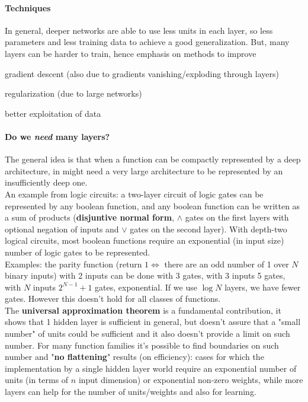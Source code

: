 \documentclass[10pt]{report}
\begin{document}
\paragraph{Techniques} In general, deeper networks are able to use less units in each layer, so less parameters and less training data to achieve a good generalization. But, many layers can be harder to train, hence emphasis on methods to improve
\begin{list}{}{}
	\item gradient descent (also due to gradients vanishing/exploding through layers)
	\item regularization (due to large networks)
	\item better exploitation of data
\end{list}
\paragraph{Do we \textit{need} many layers?} The general idea is that when a function can be compactly represented by a deep architecture, in might need a very large architecture to be represented by an insufficiently deep one.\\
An example from logic circuits: a two-layer circuit of logic gates can be represented by any boolean function, and any boolean function can be written as a sum of products (\textbf{disjuntive normal form}, $\wedge$ gates on the first layers with optional negation of inputs and $\vee$ gates on the second layer). With depth-two logical circuits, most boolean functions require an exponential (in input size) number of logic gates to be represented.\\
Examples: the parity function (return $1\Leftrightarrow$ there are an odd number of 1 over $N$ binary inputs) with 2 inputs can be done with 3 gates, with 3 inputs 5 gates, with $N$ inputs $2^{N-1}+1$ gates, exponential. If we use $\log N$ layers, we have fewer gates. However this doesn't hold for all classes of functions.\\
The \textbf{universal approximation theorem} is a fundamental contribution, it shows that 1 hidden layer is sufficient in general, but doesn't assure that a "small number" of units could be sufficient and it also doesn't provide a limit on such number. For many function families it's possible to find boundaries on such number and "\textbf{no flattening}" results (on efficiency): cases for which the implementation by a single hidden layer world require an exponential number of units (in terms of $n$ input dimension) or exponential non-zero weights, while more layers can help for the number of units/weights and also for learning.
\end{document}
